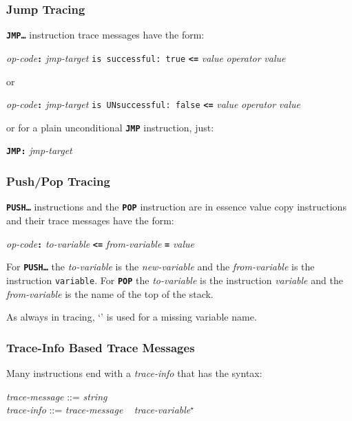 \documentclass[12pt]{article}
\newcommand{\TT}[1]{{\tt \bfseries #1}}
\newcommand{\STAR}{{\Large $^\star$}}
\newenvironment{indpar}[1][0.3in]%
	{\begin{list}{}%
		     {\setlength{\itemsep}{0in}%
		      \setlength{\topsep}{0in}%
		      \setlength{\parsep}{1ex}%
		      \setlength{\labelwidth}{#1}%
		      \setlength{\leftmargin}{#1}%
		      \addtolength{\leftmargin}{\labelsep}}%
	 \item}%
	{\end{list}}
\begin{document}
\subsubsection{Jump Tracing}
\label{JUMP-TRACING}

\TT{JMP\ldots} instruction trace messages have the form:

\begin{center}
{\em op-code}\TT{:} {\em jmp-target} {\tt is successful:~true}
                    \TT{<=} {\em value} {\em operator} {\em value}
\end{center}
or
\begin{center}
{\em op-code}\TT{:} {\em jmp-target} {\tt is UNsuccessful:~false}
                    \TT{<=} {\em value} {\em operator} {\em value}
\end{center}

or for a plain unconditional \TT{JMP} instruction, just:
\begin{center}
\TT{JMP:} {\em jmp-target}
\end{center}

\subsubsection{Push/Pop Tracing}
\label{PUSH/POP-TRACING}

\TT{PUSH\ldots} instructions and the \TT{POP} instruction are in essence
value copy instructions and their trace messages
have the form:

\begin{center}
{\em op-code}\TT{:} {\em to-variable}
                    \TT{<=} {\em from-variable} \TT{=} {\em value}
\end{center}

For \TT{PUSH\ldots} the {\em to-variable} is the {\em new-variable}
and the {\em from-variable} is the instruction {\tt variable}.
For \TT{POP} the {\em to-variable} is the instruction {\em variable}
and the {\em from-variable} is the name of the top of the stack.

As always in tracing, `\TT{*}' is used for a missing variable name.


\subsubsection{Trace-Info Based Trace Messages}
\label{TRACE-INFO-BASED-TRACE-MESSAGES}

Many instructions end with a {\em trace-info} that has the syntax:
\begin{indpar}
{\em trace-message} ::= {\em string}
\\[0.5ex]
{\em trace-info} ::= {\em trace-message} ~ {\em trace-variable}\STAR{}
\end{indpar}
\end{document}
